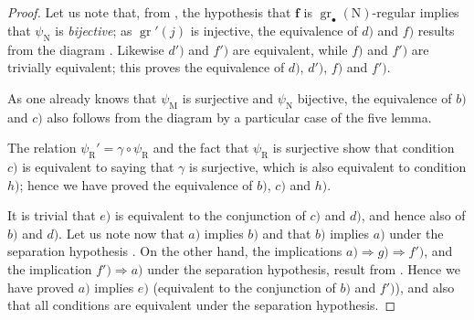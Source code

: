 \begin{proof}
Let us note that, from , the hypothesis that $\mathbf{f}$ is $\operatorname{gr}_\bullet(\mathrm{N})$-regular implies that $\psi_\mathrm{N}$ is \emph{bijective}; as $\operatorname{gr}'(j)$ is injective, the equivalence of $d)$ and $f)$ results from the diagram . Likewise $d')$ and $f')$ are equivalent, while $f)$ and $f')$ are trivially equivalent; this proves the equivalence of $d)$, $d')$, $f)$ and $f')$.

As one already knows that $\psi_\mathrm{M}$ is surjective and $\psi_\mathrm{N}$ bijective, the equivalence of $b)$ and $c)$ also follows from the diagram  by a particular case of the five lemma.

The relation $\psi_\mathrm{R}'=\gamma\circ\psi_\mathrm{R}$  and the fact that $\psi_\mathrm{R}$ is surjective show that condition $c)$ is equivalent to saying that $\gamma$ is surjective, which is also equivalent to condition $h)$; hence we have proved the equivalence of $b)$, $c)$ and $h)$.

It is trivial that $e)$ is equivalent to the conjunction of $c)$ and $d)$, and hence also of $b)$ and $d)$. Let us note now that $a)$ implies $b)$ and that $b)$ implies $a)$ under the separation hypothesis . On the other hand, the implications $a)\Rightarrow g)\Rightarrow f')$, and the implication $f')\Rightarrow a)$ under the separation hypothesis, result from . Hence we have proved $a)$ implies $e)$ (equivalent to the conjunction of $b)$ and $f')$), and also that all conditions are equivalent under the separation hypothesis.
\end{proof}

